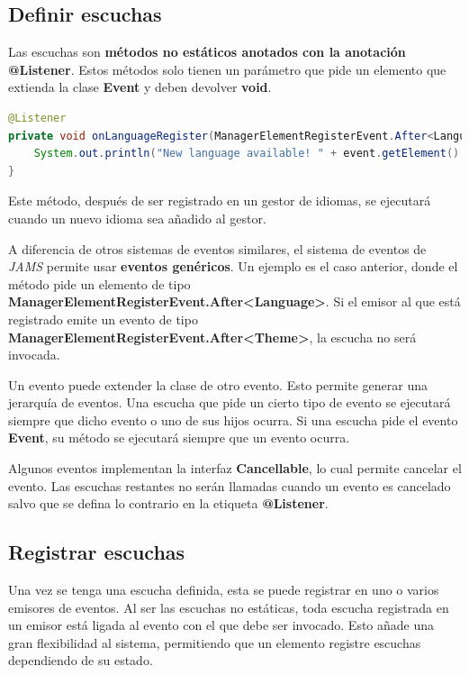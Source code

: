 \subsection{Definir escuchas}\label{subsec:definir-escuchas}

Las escuchas son \textbf{métodos no estáticos anotados con la anotación @Listener}.
Estos métodos solo tienen un parámetro que pide un elemento que extienda la clase
\textbf{Event} y deben devolver \textbf{void}.

\begin{lstlisting}[language=Java,style=java,frame=single,label={lst:definir-escuchas}]
@Listener
private void onLanguageRegister(ManagerElementRegisterEvent.After<Language> event) {
    System.out.println("New language available! " + event.getElement().getName());
}
\end{lstlisting}

\noindent Este método, después de ser registrado en un gestor de idiomas,
se ejecutará cuando un nuevo idioma sea añadido al gestor.

\noindent A diferencia de otros sistemas de eventos similares,
el sistema de eventos de \textit{JAMS} permite usar \textbf{eventos genéricos}.
Un ejemplo es el caso anterior, donde el método pide un elemento de tipo
\textbf{ManagerElementRegisterEvent.After<Language>}.
Si el emisor al que está registrado emite un evento de tipo
\textbf{ManagerElementRegisterEvent.After<Theme>}, la escucha no será invocada.

\noindent Un evento puede extender la clase de otro evento.
Esto permite generar una jerarquía de eventos.
Una escucha que pide un cierto tipo de evento se ejecutará siempre que dicho evento o uno de sus hijos ocurra.
Si una escucha pide el evento \textbf{Event}, su método se ejecutará siempre que un evento ocurra.

\noindent Algunos eventos implementan la interfaz \textbf{Cancellable}, lo cual permite cancelar el evento.
Las escuchas restantes no serán llamadas cuando un evento es cancelado salvo que se defina lo contrario
en la etiqueta \textbf{@Listener}.

\subsection{Registrar escuchas}\label{subsec:registrar-escuchas}

Una vez se tenga una escucha definida, esta se puede registrar en uno o varios emisores de eventos.
Al ser las escuchas no estáticas, toda escucha registrada en un emisor está ligada al evento con el
que debe ser invocado.
Esto añade una gran flexibilidad al sistema, permitiendo que un elemento registre
escuchas dependiendo de su estado.

